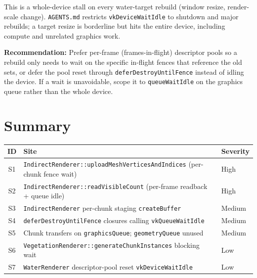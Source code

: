 \documentclass[a4paper,12pt]{article}
\begin{document}
\begin{enumerate}[leftmargin=*]
  This is a whole-device stall on every water-target rebuild (window resize,
  render-scale change). \texttt{AGENTS.md} restricts \texttt{vkDeviceWaitIdle} to
  shutdown and major rebuilds; a target resize is borderline but hits the entire
  device, including compute and unrelated graphics work.

  \textbf{Recommendation:}
  Prefer per-frame (frames-in-flight) descriptor pools so a rebuild only needs
  to wait on the specific in-flight fences that reference the old sets, or defer
  the pool reset through \texttt{deferDestroyUntilFence} instead of idling the
  device. If a wait is unavoidable, scope it to \texttt{queueWaitIdle} on the
  graphics queue rather than the whole device.

\end{enumerate}

\newpage

\section{Summary}

\begin{center}
\begin{tabular}{cll}
\toprule
\textbf{ID} & \textbf{Site} & \textbf{Severity} \\
\midrule
S1 & \texttt{IndirectRenderer::uploadMeshVerticesAndIndices} (per-chunk fence wait) & High   \\
S2 & \texttt{IndirectRenderer::readVisibleCount} (per-frame readback + queue idle) & High   \\
S3 & \texttt{IndirectRenderer} per-chunk staging \texttt{createBuffer} & Medium \\
S4 & \texttt{deferDestroyUntilFence} closures calling \texttt{vkQueueWaitIdle} & Medium \\
S5 & Chunk transfers on \texttt{graphicsQueue}; \texttt{geometryQueue} unused & Medium \\
S6 & \texttt{VegetationRenderer::generateChunkInstances} blocking wait & Low    \\
S7 & \texttt{WaterRenderer} descriptor-pool reset \texttt{vkDeviceWaitIdle} & Low    \\
\bottomrule
\end{tabular}
\end{center}
\end{document}
